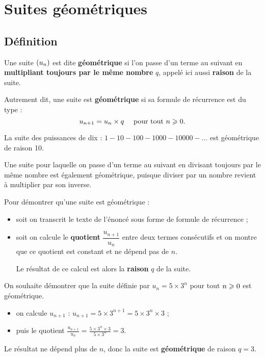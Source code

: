 \documentclass[a4paper,11pt]{article}
\begin{document}
\section{Suites géométriques}

\subsection{Définition}

\begin{cdefi}
Une suite $\left( u_n \right)$ est dite \textbf{géométrique} si l'on passe d'un terme au suivant en \textbf{multipliant toujours par le même nombre} $q$, appelé ici aussi \textbf{raison} de la suite.

Autrement dit, une suite est \textbf{géométrique} si sa formule de récurrence est du type : \[u_{n+1}=u_n \times q \quad \text{ pour tout } n \geqslant 0.\]
\end{cdefi}

\begin{cexemple}
La suite des puissances de dix : $1-10-100-1000-10000-\ldots$ est géométrique de raison 10.
\end{cexemple}

\begin{crmq}
Une suite pour laquelle on passe d'un terme au suivant en divisant toujours par le même nombre est également géométrique, puisque diviser par un nombre revient à multiplier par son inverse.
\end{crmq}

\begin{cmethode}
Pour démontrer qu'une suite est géométrique :
\begin{itemize}
	\item soit on transcrit le texte de l'énoncé sous forme de formule de récurrence ;
	\item soit on calcule le \textbf{quotient} $\dfrac{u_{n+1}}{u_n}$ entre deux termes consécutifs et on montre que ce quotient est constant et ne dépend pas de $n$.
	
	Le résultat de ce calcul est alors la \textbf{raison} $q$ de la suite.
\end{itemize}
\end{cmethode}

\begin{cexemple}
On souhaite démontrer que la suite définie par $u_n=5\times 3^n$ pour tout $n \geqslant 0$ est géométrique.
\begin{itemize}
	\item on calcule $u_{n+1}$ : $u_{n+1}=5\times 3^{n+1}=5 \times 3^n \times 3$ ;
	\item puis le quotient $\frac{u_{n+1}}{u_n}=\frac{5 \times 3^n \times 3}{5\times 3^{n}}=3$.
\end{itemize}
Le résultat ne dépend plus de $n$, donc la suite est \textbf{géométrique} de raison $q=3$.
\end{cexemple}
\end{document}
